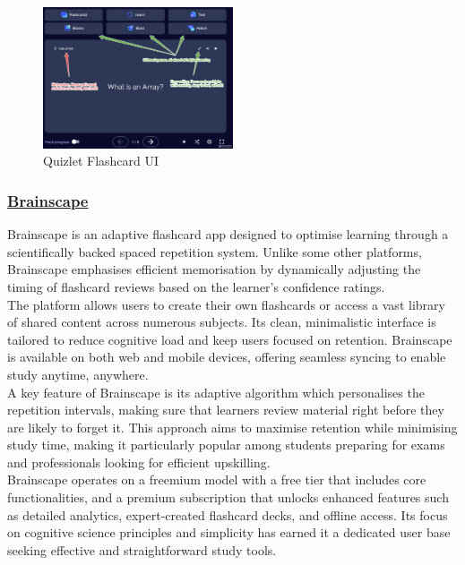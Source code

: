 \documentclass[a4paper,12pt]{article}
\begin{document}
\begin{figure}[H]
    \centering
    \includegraphics[width=0.5\textwidth]{../Screenshots/QuizletFlashcard.png}
    \caption{Quizlet Flashcard UI}
    \label{fig:quizlethome}
\end{figure}

\subsubsection{\underline{Brainscape}}
Brainscape is an adaptive flashcard app designed to optimise learning through a scientifically backed spaced repetition system. Unlike some other platforms, Brainscape emphasises efficient memorisation by dynamically adjusting the timing of flashcard reviews based on the learner’s confidence ratings. \\
The platform allows users to create their own flashcards or access a vast library of shared content across numerous subjects. Its clean, minimalistic interface is tailored to reduce cognitive load and keep users focused on retention. Brainscape is available on both web and mobile devices, offering seamless syncing to enable study anytime, anywhere. \\

A key feature of Brainscape is its adaptive algorithm which personalises the repetition intervals, making sure that learners review material right before they are likely to forget it. This approach aims to maximise retention while minimising study time, making it particularly popular among students preparing for exams and professionals looking for efficient upskilling. \\

Brainscape operates on a freemium model with a free tier that includes core functionalities, and a premium subscription that unlocks enhanced features such as detailed analytics, expert-created flashcard decks, and offline access. Its focus on cognitive science principles and simplicity has earned it a dedicated user base seeking effective and straightforward study tools. \\
\end{document}
